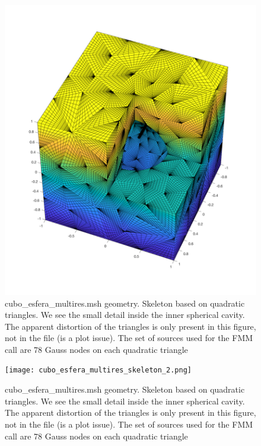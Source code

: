 \documentclass[11pt, oneside]{article}   	%
\begin{document}
\begin{figure}[H]
\begin{center}
\includegraphics[width=6in]{cubo_esfera_multires_skeleton_1.pdf}
\end{center}
\caption{cubo\_esfera\_multires.msh geometry. Skeleton based on quadratic triangles. We see the small detail inside the inner spherical cavity. The apparent distortion of the triangles is only present in this figure, not in the file (is a plot issue). The set of sources used for the FMM call are 78 Gauss nodes on each quadratic triangle}
\label{cubo_esfera_multires_skeleton}
\end{figure}


\begin{figure}[H]
\begin{center}
\texttt{[image: cubo\_esfera\_multires\_skeleton\_2.png]}
\end{center}
\caption{cubo\_esfera\_multires.msh geometry. Skeleton based on quadratic triangles. We see the small detail inside the inner spherical cavity. The apparent distortion of the triangles is only present in this figure, not in the file (is a plot issue). The set of sources used for the FMM call are 78 Gauss nodes on each quadratic triangle}
\label{cubo_esfera_multires_skeleton}
\end{figure}
\end{document}
